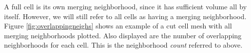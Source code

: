 \begin{itemize}
\vspace*{.1in}
A full cell is its own merging neighborhood, since it has sufficient
volume all by itself. However, we will still refer to all cells as having a
merging neighborhood.  Figure \ref{fig:overlappingneighs} shows an example of a
cut cell mesh with all merging neighborhoods plotted.  Also displayed
are the number of overlapping neighborhoods for each cell. This is the 
neighborhood {\em count} referred to above.
\begin{figure}
	\hfill
	\hfill
    \hfill

\end{figure}
\end{itemize}
